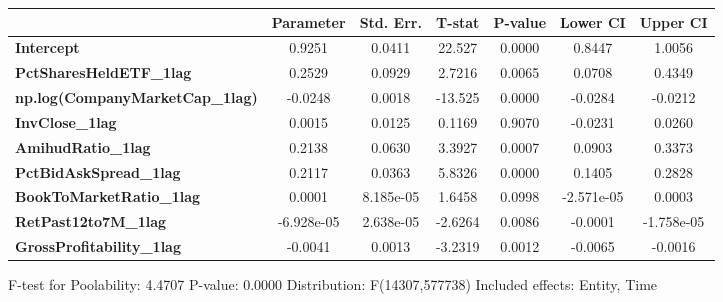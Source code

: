 \begin{center}
\begin{tabular}{lclc}
\bottomrule
\end{tabular}
\begin{tabular}{lcccccc}
                                        & \textbf{Parameter} & \textbf{Std. Err.} & \textbf{T-stat} & \textbf{P-value} & \textbf{Lower CI} & \textbf{Upper CI}  \\
\midrule
\textbf{Intercept}                      &       0.9251       &       0.0411       &      22.527     &      0.0000      &       0.8447      &       1.0056       \\
\textbf{PctSharesHeldETF\_1lag}         &       0.2529       &       0.0929       &      2.7216     &      0.0065      &       0.0708      &       0.4349       \\
\textbf{np.log(CompanyMarketCap\_1lag)} &      -0.0248       &       0.0018       &     -13.525     &      0.0000      &      -0.0284      &      -0.0212       \\
\textbf{InvClose\_1lag}                 &       0.0015       &       0.0125       &      0.1169     &      0.9070      &      -0.0231      &       0.0260       \\
\textbf{AmihudRatio\_1lag}              &       0.2138       &       0.0630       &      3.3927     &      0.0007      &       0.0903      &       0.3373       \\
\textbf{PctBidAskSpread\_1lag}          &       0.2117       &       0.0363       &      5.8326     &      0.0000      &       0.1405      &       0.2828       \\
\textbf{BookToMarketRatio\_1lag}        &       0.0001       &     8.185e-05      &      1.6458     &      0.0998      &     -2.571e-05    &       0.0003       \\
\textbf{RetPast12to7M\_1lag}            &     -6.928e-05     &     2.638e-05      &     -2.6264     &      0.0086      &      -0.0001      &     -1.758e-05     \\
\textbf{GrossProfitability\_1lag}       &      -0.0041       &       0.0013       &     -3.2319     &      0.0012      &      -0.0065      &      -0.0016       \\
\bottomrule
\end{tabular}
\end{center}

F-test for Poolability: 4.4707 \newline
 P-value: 0.0000 \newline
 Distribution: F(14307,577738) \newline
  \newline
 Included effects: Entity, Time